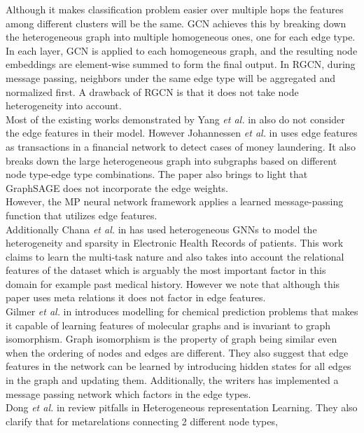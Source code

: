 \documentclass{report} %
\begin{document}
Although it makes classification problem easier over multiple hops the features among different clusters will be the same.
GCN achieves this by breaking down the heterogeneous graph into multiple homogeneous ones, one for each edge type. 
In each layer, GCN is applied to each homogeneous graph, and the resulting node embeddings are element-wise summed to form the final output. 
In RGCN, during message passing, neighbors under the same edge type will be aggregated and normalized first. 
A drawback of RGCN is that it does not take node heterogeneity into account. \\
Most of the existing works demonstrated by Yang \textit{et al.} in \cite{HGNN-2020} also do not consider the edge features in their model. 
However Johannessen \textit{et al.} in \cite{ML HGNN-2023} uses edge features as transactions in a financial network to detect cases of money laundering.
It also breaks down the large heterogeneous graph into subgraphs based on different node type-edge type combinations. 
The paper also brings to light that GraphSAGE does not incorporate the edge weights.\\
However, the \ac{MP} neural network framework applies a learned message-passing function that utilizes edge features.\\
Additionally Chana \textit{et al.} in \cite{EHR HGNN-2024} has used heterogeneous \ac{GNN}s to model the heterogeneity and sparsity in Electronic 
Health Records of patients. This work claims to learn the multi-task nature and also takes into account the relational features of the dataset which is arguably the 
most important factor in this domain for example past medical history. However we note that although this paper uses meta relations it does not factor in edge features.\\
Gilmer \textit{et al.} in \cite{QC-MP-2017} introduces modelling for chemical prediction problems that makes it capable of learning features of molecular graphs 
and is invariant to graph isomorphism. Graph isomorphism is the property of graph being similar even when the ordering of nodes and edges are different.
They also suggest that edge features in the network can be learned by introducing hidden states for all edges in the graph and updating them.
Additionally, the writers has implemented a message passing network which factors in the edge types.\\
Dong \textit{et al.} in \cite{HNRL-2020} review pitfalls in Heterogeneous representation Learning. They also clarify that for metarelations connecting 2 different node types,  
\end{document}
